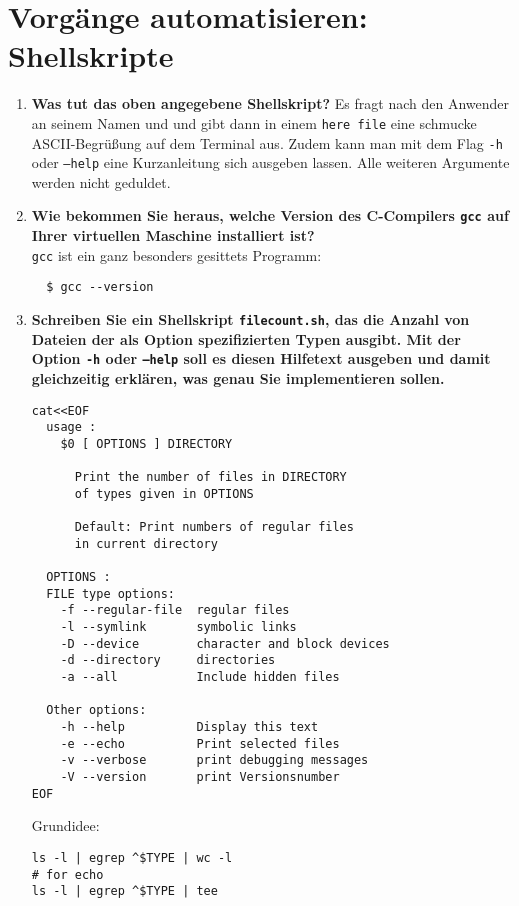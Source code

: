 \documentclass[
   draft=false
  ,paper=a4
  ,twoside=false
  ,fontsize=11pt
  ,headsepline
  ,BCOR10mm
  ,DIV11
]{scrartcl} %
\begin{document}
\section{Vorgänge automatisieren: Shellskripte}
\begin{enumerate}
  \item \textbf{Was tut das oben angegebene Shellskript?}
  Es fragt nach den Anwender an seinem Namen und und gibt dann in einem
  \texttt{here file} eine schmucke ASCII-Begrüßung auf dem Terminal aus.
  Zudem kann man mit dem Flag \texttt{-h} oder \texttt{--help} eine
  Kurzanleitung sich ausgeben lassen. Alle weiteren Argumente werden nicht
  geduldet.

  \item \textbf{Wie bekommen Sie heraus, welche Version des C-Compilers
  \texttt{gcc} auf Ihrer virtuellen Maschine installiert ist?}\\
  \texttt{gcc} ist ein ganz besonders gesittets Programm:
  \begin{verbatim}
  $ gcc --version
  \end{verbatim}

  \item \textbf{Schreiben Sie ein Shellskript \texttt{filecount.sh}, das die
  Anzahl von Dateien der als Option spezifizierten Typen ausgibt. Mit der
  Option \texttt{-h} oder \texttt{--help} soll es diesen Hilfetext ausgeben und
  damit gleichzeitig erklären, was genau Sie implementieren sollen.}
  \\
  \begin{verbatim}
cat<<EOF
  usage :
    $0 [ OPTIONS ] DIRECTORY

      Print the number of files in DIRECTORY
      of types given in OPTIONS

      Default: Print numbers of regular files
      in current directory

  OPTIONS :
  FILE type options:
    -f --regular-file  regular files
    -l --symlink       symbolic links
    -D --device        character and block devices
    -d --directory     directories
    -a --all           Include hidden files

  Other options:
    -h --help          Display this text
    -e --echo          Print selected files
    -v --verbose       print debugging messages
    -V --version       print Versionsnumber
EOF
  \end{verbatim}
Grundidee:
\begin{verbatim}
ls -l | egrep ^$TYPE | wc -l
# for echo
ls -l | egrep ^$TYPE | tee
\end{verbatim}

\end{enumerate}
\end{document}
